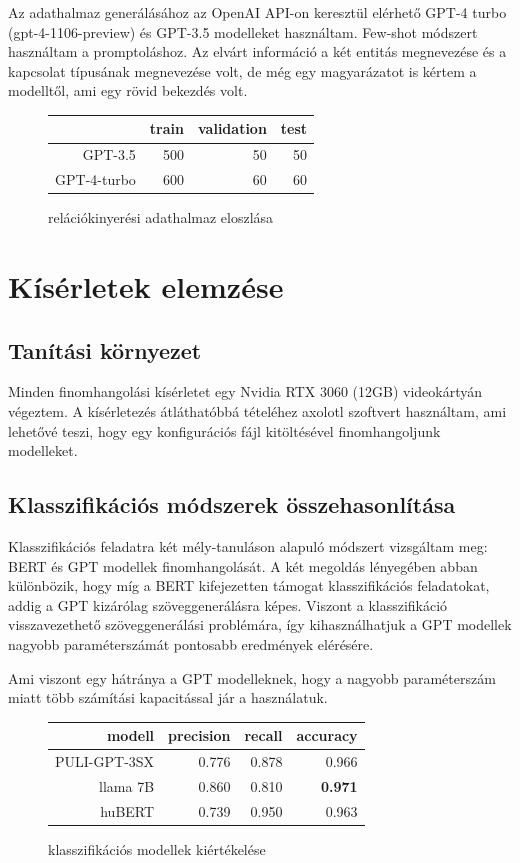 Az adathalmaz generálásához az OpenAI API-on keresztül elérhető GPT-4 turbo (gpt-4-1106-preview) és GPT-3.5 modelleket használtam. Few-shot módszert használtam a promptoláshoz. Az elvárt információ a két entitás megnevezése és a kapcsolat típusának megnevezése volt, de még egy magyarázatot is kértem a modelltől, ami egy rövid bekezdés volt.

\begin{figure}[H]
	\centering
\begin{tabular}{rrrr}
	& train & validation & test \\ \hline
	GPT-3.5 & 500 & 50 & 50 \\
	GPT-4-turbo & 600 & 60 & 60 \\
\end{tabular}
\caption{relációkinyerési adathalmaz eloszlása}
\end{figure}

\section{Kísérletek elemzése}

\subsection{Tanítási környezet}

Minden finomhangolási kísérletet egy Nvidia RTX 3060 (12GB) videokártyán végeztem. A kísérletezés átláthatóbbá tételéhez axolotl szoftvert használtam, ami lehetővé teszi, hogy egy konfigurációs fájl kitöltésével finomhangoljunk modelleket.

\subsection{Klasszifikációs módszerek összehasonlítása}

Klasszifikációs feladatra két mély-tanuláson alapuló módszert vizsgáltam meg: BERT és GPT modellek finomhangolását. A két megoldás lényegében abban különbözik, hogy míg a BERT kifejezetten támogat klasszifikációs feladatokat, addig a GPT kizárólag szöveggenerálásra képes. Viszont a klasszifikáció visszavezethető szöveggenerálási problémára, így kihasználhatjuk a GPT modellek nagyobb paraméterszámát pontosabb eredmények elérésére.

Ami viszont egy hátránya a GPT modelleknek, hogy a nagyobb paraméterszám miatt több számítási kapacitással jár a használatuk.

\begin{figure}[H]
	\centering
	\begin{tabular}{rrrr}
		modell & precision & recall  & accuracy \\ \hline
		PULI-GPT-3SX & 0.776 & 0.878 & 0.966  \\
		llama 7B & 0.860 & 0.810 & \textbf{0.971} 	\\
		huBERT & 0.739 & 0.950 & 0.963 \\
	\end{tabular}
	\caption{klasszifikációs modellek kiértékelése}
\end{figure}

